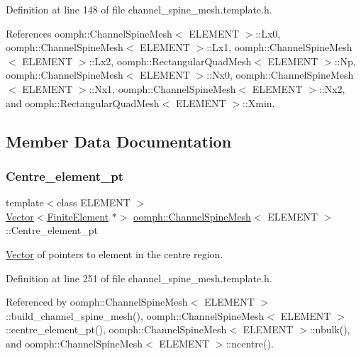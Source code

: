 Definition at line 148 of file channel\+\_\+spine\+\_\+mesh.\+template.\+h.



References oomph\+::\+Channel\+Spine\+Mesh$<$ E\+L\+E\+M\+E\+N\+T $>$\+::\+Lx0, oomph\+::\+Channel\+Spine\+Mesh$<$ E\+L\+E\+M\+E\+N\+T $>$\+::\+Lx1, oomph\+::\+Channel\+Spine\+Mesh$<$ E\+L\+E\+M\+E\+N\+T $>$\+::\+Lx2, oomph\+::\+Rectangular\+Quad\+Mesh$<$ E\+L\+E\+M\+E\+N\+T $>$\+::\+Np, oomph\+::\+Channel\+Spine\+Mesh$<$ E\+L\+E\+M\+E\+N\+T $>$\+::\+Nx0, oomph\+::\+Channel\+Spine\+Mesh$<$ E\+L\+E\+M\+E\+N\+T $>$\+::\+Nx1, oomph\+::\+Channel\+Spine\+Mesh$<$ E\+L\+E\+M\+E\+N\+T $>$\+::\+Nx2, and oomph\+::\+Rectangular\+Quad\+Mesh$<$ E\+L\+E\+M\+E\+N\+T $>$\+::\+Xmin.



\subsection{Member Data Documentation}
\mbox{\label{classoomph_1_1ChannelSpineMesh_aef52a18c46a4ec6121a129789d46db3e}} 
\subsubsection{\texorpdfstring{Centre\+\_\+element\+\_\+pt}{Centre\_element\_pt}}
{\footnotesize\ttfamily template$<$class E\+L\+E\+M\+E\+NT $>$ \\
\hyperlink{classoomph_1_1Vector}{Vector}$<$\hyperlink{classoomph_1_1FiniteElement}{Finite\+Element} $\ast$$>$ \hyperlink{classoomph_1_1ChannelSpineMesh}{oomph\+::\+Channel\+Spine\+Mesh}$<$ E\+L\+E\+M\+E\+NT $>$\+::Centre\+\_\+element\+\_\+pt\hspace{0.3cm}{\ttfamily [protected]}}



\hyperlink{classoomph_1_1Vector}{Vector} of pointers to element in the centre region. 



Definition at line 251 of file channel\+\_\+spine\+\_\+mesh.\+template.\+h.



Referenced by oomph\+::\+Channel\+Spine\+Mesh$<$ E\+L\+E\+M\+E\+N\+T $>$\+::build\+\_\+channel\+\_\+spine\+\_\+mesh(), oomph\+::\+Channel\+Spine\+Mesh$<$ E\+L\+E\+M\+E\+N\+T $>$\+::centre\+\_\+element\+\_\+pt(), oomph\+::\+Channel\+Spine\+Mesh$<$ E\+L\+E\+M\+E\+N\+T $>$\+::nbulk(), and oomph\+::\+Channel\+Spine\+Mesh$<$ E\+L\+E\+M\+E\+N\+T $>$\+::ncentre().

